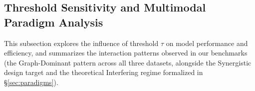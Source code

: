 \documentclass[preprint,12pt,authoryear]{elsarticle}
\begin{document}
\begin{table}[!t]
\centering
\small
\caption{Surface-noise robustness on NLM-Chem (30 test nodes). Static full fusion (Always Full) degrades under both per-character typos and OCR-style confusions, while CG-Net stays at 1.0000 via the Soft Masker's modality-safe fallback (Drop Text is text-free and therefore unaffected). Each 0.033 accuracy step is one test node, so the accuracy grid is correspondingly coarse.}
\label{tab:noise}
\end{table}

\subsection{Threshold Sensitivity and Multimodal Paradigm Analysis}
This subsection explores the influence of threshold $\tau$ on model performance and efficiency, and summarizes the interaction patterns observed in our benchmarks (the Graph-Dominant pattern across all three datasets, alongside the Synergistic design target and the theoretical Interfering regime formalized in \S\ref{sec:paradigms}).
\end{document}
